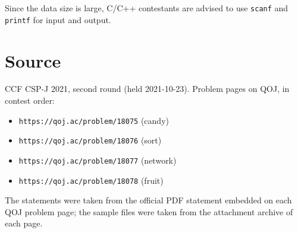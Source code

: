 \documentclass[11pt]{article}
\begin{document}
Since the data size is large, C/C++ contestants are advised to use
\texttt{scanf} and \texttt{printf} for input and output.

\section*{Source}

CCF CSP-J 2021, second round (held 2021-10-23).
Problem pages on QOJ, in contest order:

\begin{itemize}
\item \texttt{https://qoj.ac/problem/18075} (candy)
\item \texttt{https://qoj.ac/problem/18076} (sort)
\item \texttt{https://qoj.ac/problem/18077} (network)
\item \texttt{https://qoj.ac/problem/18078} (fruit)
\end{itemize}

The statements were taken from the official PDF statement embedded on each
QOJ problem page;
the sample files were taken from the attachment archive of each page.
\end{document}
